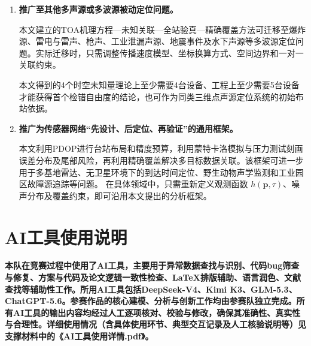 \documentclass[draft,12pt,a4paper]{ctexart}
\theoremstyle{definition}
\begin{document}
\begin{enumerate}[label=\arabic*.]

\item \textbf{推广至其他多声源或多波源被动定位问题。}

本文建立的TOA机理方程—未知关联—全站验真—精确覆盖方法可迁移至爆炸源、雷电与雷声、枪声、工业泄漏声源、地震事件及水下声源等多波源定位问题。实际迁移时，只需调整传播速度模型、坐标换算方式、空间边界和一对一关联约束。

本文得到的4个时空未知量理论上至少需要4台设备、工程上至少需要5台设备才能获得首个检错自由度的结论，也可作为同类三维点声源定位系统的初始布站依据。

\item \textbf{推广为传感器网络“先设计、后定位、再验证”的通用框架。}

本文利用PDOP进行台站布局和精度预算，利用蒙特卡洛模拟与压力测试刻画误差分布及尾部风险，再利用精确覆盖解决多目标数据关联。该框架可进一步用于多基地雷达、无卫星环境下的到达时间定位、野生动物声学监测和工业园区故障源追踪等问题。
在具体领域中，只需重新定义观测函数
$h(\boldsymbol{p},\tau)$、噪声分布及覆盖约束，即可沿用本文提出的分析框架。

\end{enumerate}
\newpage

\section{AI工具使用说明}
\textbf{本队在竞赛过程中使用了AI工具，主要用于异常数据查找与识别、代码bug筛查与修复、方案与代码及论文逻辑一致性检查、LaTeX排版辅助、语言润色、文献查找等辅助性工作。所用AI工具包括DeepSeek-V4、Kimi K3、GLM-5.3、ChatGPT-5.6。参赛作品的核心建模、分析与创新工作均由参赛队独立完成。所有AI工具的输出内容均经过人工逐项核对、校验与修改，确保其准确性、真实性与合理性。详细使用情况（含具体使用环节、典型交互记录及人工核验说明等）见支撑材料中的《AI工具使用详情.pdf》。}
\end{document}
